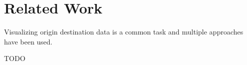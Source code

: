 \documentclass[a4paper,twocolumn]{article}
\author{Josua Krause}
\begin{document}
\section*{Related Work}
Visualizing origin destination data is a common task
and multiple approaches have been used.

TODO



\end{document}

